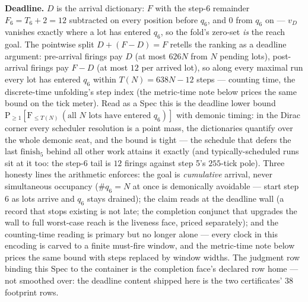{\smallskip
\noindent\textbf{Deadline.} $D$ is the arrival dictionary: $F$ with
the step-6 remainder $F_6 = T_6 + 2 = 12$ subtracted on every
position before $q_6$, and $0$ from $q_6$ on --- $v_D$ vanishes
exactly where a lot has entered $q_6$, so the fold's zero-set
\emph{is} the reach goal. The pointwise split $D + (F - D) = F$
retells the ranking as a deadline argument: pre-arrival firings pay
$D$ (at most $626N$ from $N$ pending lots), post-arrival firings pay
$F - D$ (at most $12$ per arrived lot), so along every maximal run
every lot has entered $q_6$ within $T(N) = 638N - 12$ steps ---
counting time, the discrete-time unfolding's step index (the
metric-time note below prices the same bound on the tick meter).
Read as a Spec this is
the deadline lower bound
$\mathrm{P}_{\ge 1}\!\left[\mathrm{F}_{\le T(N)}\,
(\text{all $N$ lots have entered } q_6)\right]$ with demonic timing:
in the Dirac corner every scheduler resolution is a point mass, the
dictionaries quantify over the whole demonic seat, and the bound is
tight --- the schedule that defers the last $\mathrm{finish}_5$
behind all other work attains it exactly (and typically-scheduled
runs sit at it too: the step-6 tail is $12$ firings against step
5's $255$-tick pole). Three honesty lines the arithmetic enforces:
the goal is \emph{cumulative} arrival, never simultaneous occupancy
($\#q_6 = N$ at once is demonically avoidable --- start step 6 as
lots arrive and $q_6$ stays drained); the claim reads at the
deadline wall (a record that stops existing is not late; the
completion conjunct that upgrades the wall to full worst-case reach
is the liveness face, priced separately); and the counting-time
reading is primary but no longer alone --- every clock in this
encoding is carved to a finite must-fire window, and the
metric-time note below prices the same bound with steps replaced by
window widths. The judgment row binding this Spec to the container
is the completion face's declared row home --- not smoothed over:
the deadline content shipped here is the two certificates' $38$
footprint rows.

}
